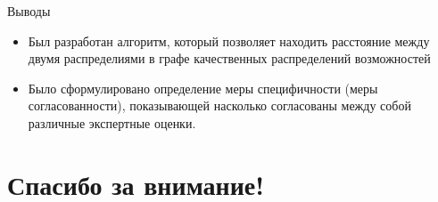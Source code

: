 \documentclass[russian, unicode, mathserif, aspectratio=169]{beamer}
\begin{document}
\begin{frame}{Выводы}
    \begin{itemize}
        \item Был разработан алгоритм, который позволяет находить расстояние между двумя распределиями в графе качественных распределений возможностей
        \item Было сформулировано определение меры специфичности (меры согласованности), показывающей насколько согласованы между собой различные экспертные оценки.
    \end{itemize}
\end{frame}

\section{Спасибо за внимание!}
{
\frame{\transdissolve\sectionpage}
}

% 
\end{document}
